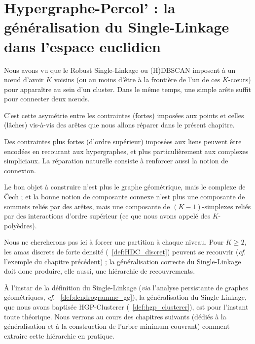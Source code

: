 \chapter{Hypergraphe-Percol' : la généralisation du Single-Linkage dans l'espace euclidien} 
\label{chap:hgp_clusterer}


Nous avons vu que le Robust Single-Linkage \cite{RobustSingleLinkage2010} ou (H)DBSCAN \cite{HDBSCAN, HDBSCAN2017} imposent à un n\oe ud d'avoir $K$ voisins  (ou au moins d'être à la frontière de l'un de ces $K$-cœurs) pour apparaître au sein d'un cluster. Dans le même temps, une simple arête suffit pour connecter deux n\oe uds.

C'est cette asymétrie entre les contraintes (fortes) imposées aux points et celles (lâches) vis-à-vis des arêtes que nous allons réparer dans le présent chapitre.

Des contraintes plus fortes (d'ordre supérieur) imposées aux liens peuvent être encodées en recourant aux hypergraphes, et plus particulièrement aux complexes simpliciaux.
La réparation naturelle consiste à renforcer aussi la notion de connexion. 

Le bon objet à construire n'est plus le graphe géométrique, mais le complexe de \v Cech \cite{Cech1932, BobrowskiKahle} ; et la bonne notion de composante connexe n'est plus une composante de sommets reliés par des arêtes, mais une composante de $(K-1)$-simplexes reliés par des interactions d'ordre supérieur (ce que nous avons appelé des $K$-polyèdres).

Nous ne chercherons pas ici à forcer une partition à chaque niveau. Pour $K\ge 2$, les amas discrets de forte densité (\Def~\ref{def:HDC_discret}) peuvent se recouvrir (\emph{cf}. l'exemple du chapitre précédent) ; la généralisation correcte du Single-Linkage doit donc produire, elle aussi, une hiérarchie de recouvrements.

À l'instar de la définition du Single-Linkage (\emph{via} l'analyse persistante de graphes géométriques, \emph{cf}. \Def~\ref{def:dendrogramme_gg}), la généralisation du Single-Linkage, que nous avons baptisée HGP-Clusterer (\Def~\ref{def:hgp_clusterer}), est pour l'instant toute théorique. Nous verrons au cours des chapitres suivants (dédiés à la généralisation et à la construction de l'arbre minimum couvrant) comment extraire cette hiérarchie en pratique.


